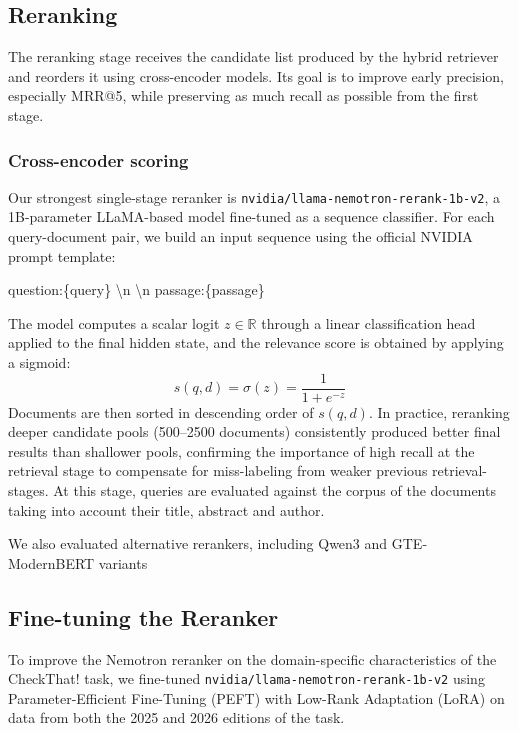 \subsection{Reranking} \label{sub:reranking}

The reranking stage receives the candidate list produced by the hybrid retriever and reorders it using cross-encoder models. Its goal is to improve early precision, especially MRR@5, while preserving as much recall as possible from the first stage.

\subsubsection*{Cross-encoder scoring}
Our strongest single-stage reranker is \texttt{nvidia/llama-nemotron-rerank-1b-v2}, a 1B-parameter LLaMA-based model fine-tuned as a sequence classifier. For each query-document pair, we build an input sequence using the official NVIDIA prompt template:
\begin{promptbox}
\small\ttfamily
question:\{query\} \textbackslash n \textbackslash n passage:\{passage\}
\end{promptbox}
The model computes a scalar logit $z \in \mathbb{R}$ through a linear classification head applied to the final hidden state, and the relevance score is obtained by applying a sigmoid:
\[
  s(q, d) = \sigma(z) = \frac{1}{1 + e^{-z}}
\]
Documents are then sorted in descending order of $s(q, d)$.
In practice, reranking deeper candidate pools (500--2500 documents) consistently produced better final results than shallower pools, confirming the importance of high recall at the retrieval stage to compensate for miss-labeling from weaker previous retrieval-stages. At this stage, queries are evaluated against the corpus of the documents taking into account their title, abstract and author.

We also evaluated alternative rerankers, including Qwen3 and GTE-ModernBERT variants

\subsection{Fine-tuning the Reranker} \label{sub:finetuning}
To improve the Nemotron reranker on the domain-specific characteristics of the CheckThat! task, we fine-tuned \texttt{nvidia/llama-nemotron-rerank-1b-v2} using Parameter-Efficient Fine-Tuning (PEFT) with Low-Rank Adaptation (LoRA)
on data from both the 2025 and 2026 editions of the task.


